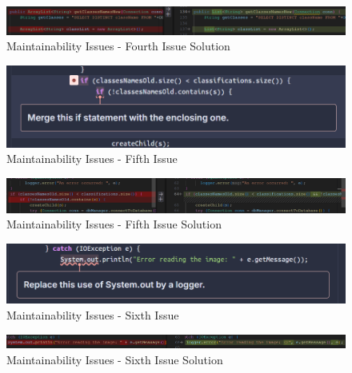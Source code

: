 \documentclass[12pt,a4paper]{article}
\begin{document}
\begin{figure}[H]
    \centering
    \includegraphics[width=1\textwidth]{Maintainability Issues-4thS.png}
    \caption{Maintainability Issues - Fourth Issue Solution}
    \label{fig:MI-4thS}
\end{figure}
\begin{figure}[H]
    \centering
    \includegraphics[width=1\textwidth]{Maintainability Issues-5th.png}
    \caption{Maintainability Issues - Fifth Issue}
    \label{fig:MI-5th}
\end{figure}
\begin{figure}[H]
    \centering
    \includegraphics[width=1\textwidth]{Maintainability Issues-5thS.png}
    \caption{Maintainability Issues - Fifth Issue Solution}
    \label{fig:MI-5thS}
\end{figure}
\begin{figure}[H]
    \centering
    \includegraphics[width=1\textwidth]{Maintainability Issues-6th.png}
    \caption{Maintainability Issues - Sixth Issue}
    \label{fig:MI-6th}
\end{figure}
\begin{figure}[H]
    \centering
    \includegraphics[width=1\textwidth]{Maintainability Issues-6thS.png}
    \caption{Maintainability Issues - Sixth Issue Solution}
    \label{fig:MI-6thS}
\end{figure}
\end{document}
